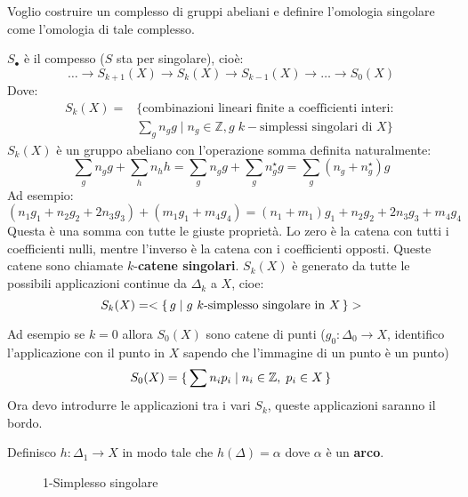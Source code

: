 \documentclass[10pt, twoside=false, x11names]{scrbook}
\newcommand{\Z}{\mathbb{Z}}
\begin{document}
Voglio costruire un complesso di gruppi abeliani e definire l'omologia singolare come l'omologia di tale complesso.

$ S_\bullet $ è il compesso ($ S $ sta per singolare), cioè:
\[
  \dots \to S_{k+1}(X) \to S_k(X) \to S_{k-1}(X) \to \dots \to S_0(X)
\]
Dove:
\begin{align*}
  S_k(X) ={}& \{\text{combinazioni lineari finite a coefficienti interi: } \\
         & \sum_g n_g g \;|\; n_g \in \Z, g \; k-\text{simplessi singolari di } X \}
\end{align*}
$ S_k(X) $ è un gruppo abeliano con l'operazione somma definita naturalmente:
\[
  \sum_g n_g g + \sum_h n_h h =   \sum_g n_g g + \sum_g n_g^\star g = \sum_g (n_g + n_g^\star)g
\]
Ad esempio:
\[
  (n_1 g_1 + n_2 g_2 + 2 n_3 g_3) + (m_1 g_1 + m_4 g_4) = (n_1 + m_1)g_1 + n_2 g_2 + 2 n_3 g_3 + m_4 g_4
\]
Questa è una somma con tutte le giuste proprietà. Lo zero è la catena con tutti i coefficienti nulli,
mentre l'inverso è la catena con i coefficienti opposti.
Queste catene sono chiamate $ k $-\textbf{catene singolari}.
$ S_k(X) $ è generato da tutte le possibili applicazioni continue da $ \Delta_k $ a $ X $, cioe:
\[
  S_k(X) = < \set{g | g \text{ $ k $-simplesso singolare in $ X $}} >
\]

Ad esempio se $ k = 0 $ allora $ S_0(X) $ sono catene di punti ($ g_0 : \Delta_0 \to X $, identifico l'applicazione
con il punto in $ X $ sapendo che l'immagine di un punto è un punto)
\[
  S_0(X) = \set { \sum n_i p_i | n_i \in \Z, \; p_i \in X}
\]
Ora devo introdurre le applicazioni tra i vari $ S_k $, queste applicazioni saranno il bordo.

Definisco $ h: \Delta_1 \to X $ in modo tale che $ h(\Delta) = \alpha $ dove $ \alpha $ è un \textbf{arco}.

\begin{figure}[htbp]
  \centering
  \caption{1-Simplesso singolare}
  \label{fig:lez1:1_standard_simplex_with_arc}
\end{figure}
\end{document}
